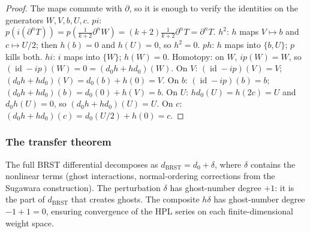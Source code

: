 \begin{proof}
The maps commute with \(\partial\), so it is enough to verify the
identities on the generators \(W,V,b,U,c\).
$pi$: $p(i(\partial^n T)) = p(\frac{1}{k+2}\partial^n W)
= (k+2)\frac{1}{k+2}\partial^n T = \partial^n T$.
$h^2$: $h$ maps $V \mapsto b$ and $c \mapsto U/2$;
then $h(b) = 0$ and $h(U) = 0$, so $h^2 = 0$.
$ph$: $h$ maps into $\{b, U\}$; $p$ kills both.
$hi$: $i$ maps into $\{W\}$; $h(W) = 0$.
Homotopy: on $W$, $ip(W) = W$, so
$(\operatorname{id} - ip)(W) = 0 = (d_0 h + h d_0)(W)$.
On $V$: $(\operatorname{id} - ip)(V) = V$;
$(d_0 h + h d_0)(V) = d_0(b) + h(0) = V$.
On $b$: $(\operatorname{id} - ip)(b) = b$;
$(d_0 h + h d_0)(b) = d_0(0) + h(V) = b$.
On $U$: $h d_0(U) = h(2c) = U$ and
$d_0 h(U) = 0$, so $(d_0 h + h d_0)(U) = U$.
On $c$: $(d_0 h + h d_0)(c) = d_0(U/2) + h(0) = c$.
\end{proof}

\subsubsection*{The transfer theorem}

The full BRST differential decomposes as $d_{\mathrm{BRST}}
= d_0 + \delta$, where $\delta$ contains the nonlinear terms
(ghost interactions, normal-ordering corrections from the
Sugawara construction). The perturbation $\delta$ has
ghost-number degree $+1$: it is the part of
$d_{\mathrm{BRST}}$ that creates ghosts. The composite
$h\delta$ has ghost-number degree $-1 + 1 = 0$, ensuring
convergence of the HPL series on each finite-dimensional
weight space.

